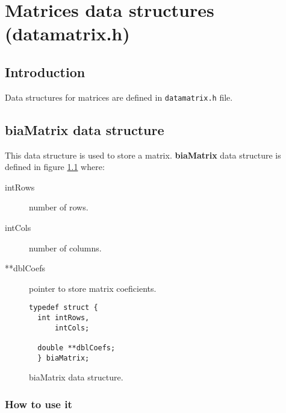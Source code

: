 %
%

\chapter{Matrices data structures (datamatrix.h)}

\section{Introduction}

Data structures for matrices are defined in \texttt{datamatrix.h} file.\\

\section{\textbf{biaMatrix} data structure} \label{sec:biaMatrix}

This data structure is used to store a matrix. \textbf{biaMatrix} data structure is defined in figure \ref{fig:biaMatrix} where:

\begin{description}
\item[intRows] number of rows.
\item[intCols] number of columns.
\item[**dblCoefs] pointer to store matrix coeficients.
\end{description}

\begin{figure}[!h]
\begin{verbatim}
typedef struct {
  int intRows,
      intCols;

  double **dblCoefs;
  } biaMatrix;   
\end{verbatim}
\caption{biaMatrix data structure.} \label{fig:biaMatrix}
\end{figure}

\FloatBarrier

\subsection{How to use it}

